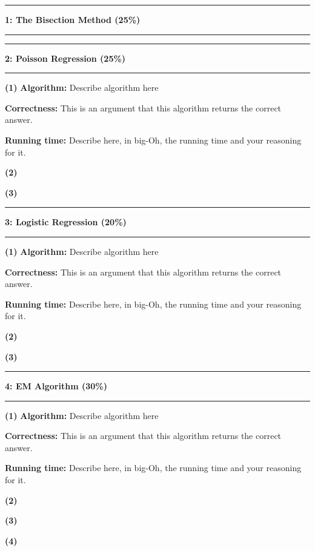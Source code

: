 \documentclass[11pt]{article}
\newcommand\question[2]{\vspace{.25in}\hrule\textbf{#1: #2}\vspace{.5em}\hrule\vspace{.10in}}
\renewcommand\part[1]{\vspace{.10in}\textbf{(#1)}}
\newcommand\algorithm{\vspace{.10in}\textbf{Algorithm: }}
\newcommand\correctness{\vspace{.10in}\textbf{Correctness: }}
\newcommand\runtime{\vspace{.10in}\textbf{Running time: }}
\begin{document}
\raggedright
\newcommand\NAME{ZHANG Xinfang}  %
\newcommand\ANDREWID{1155141566}     %
\newcommand\HWNUM{1}              %

\question{1}{The Bisection Method (25\%)} 




\question{2}{Poisson Regression (25\%)}

\part{1} \algorithm Describe algorithm here

\correctness This is an argument  that this algorithm returns the correct answer.

\runtime Describe here, in big-Oh, the running time and your reasoning for it.

\part{2}

\part{3}

\question{3}{Logistic Regression (20\%)}

\part{1} \algorithm Describe algorithm here

\correctness This is an argument  that this algorithm returns the correct answer.

\runtime Describe here, in big-Oh, the running time and your reasoning for it.

\part{2}

\part{3}

\question{4}{EM Algorithm (30\%)}

\part{1} \algorithm Describe algorithm here

\correctness This is an argument  that this algorithm returns the correct answer.

\runtime Describe here, in big-Oh, the running time and your reasoning for it.

\part{2}

\part{3}

\part{4}
\end{document}
